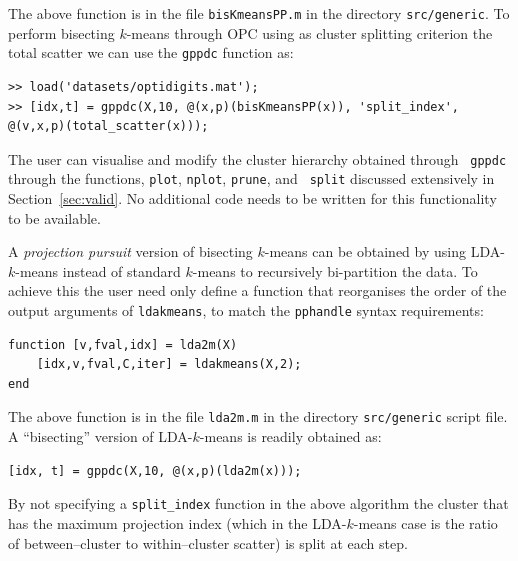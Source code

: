 \documentclass{book}
\begin{document}
\noindent
%
The above function is in the file {\tt bisKmeansPP.m} in the directory {\tt src/generic}.
To perform bisecting $k$-means through OPC using as cluster splitting criterion 
the total scatter we can use the {\tt gppdc} function as:

\begin{verbatim}
>> load('datasets/optidigits.mat');
>> [idx,t] = gppdc(X,10, @(x,p)(bisKmeansPP(x)), 'split_index', @(v,x,p)(total_scatter(x)));
\end{verbatim}

\noindent
%
The user can visualise and modify the cluster hierarchy obtained through {\tt
gppdc} through the functions, {\tt plot}, {\tt nplot}, {\tt prune}, and {\tt
split} discussed extensively in Section~\ref{sec:valid}. No additional code
needs to be written for this functionality to be available.



A {\em projection pursuit} version of bisecting $k$-means
can be obtained by using LDA-$k$-means instead of standard $k$-means to recursively bi-partition
the data.
To achieve this the user need only define a function that reorganises the order of the output
arguments of {\tt ldakmeans}, to match the {\tt pphandle} syntax requirements:

\begin{verbatim}
function [v,fval,idx] = lda2m(X)
	[idx,v,fval,C,iter] = ldakmeans(X,2);
end
\end{verbatim}

\noindent
%
The above function is in the file {\tt lda2m.m} in the directory {\tt src/generic} script file.
A ``bisecting'' version of LDA-$k$-means is readily obtained as:

\begin{verbatim}
[idx, t] = gppdc(X,10, @(x,p)(lda2m(x)));
\end{verbatim}


\noindent
%
By not specifying a {\tt split\_index} function in the above algorithm the
cluster that has the maximum projection index (which in the LDA-$k$-means case
is the ratio of between--cluster to within--cluster scatter) is split at each step.




\end{document}
